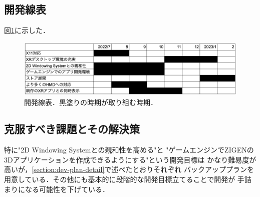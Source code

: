\subsection{開発線表}

図\ref{fig:schedule}に示した．

\begin{figure}[htbp]
  \centering
  \includegraphics[keepaspectratio, width=\linewidth]{fig/schedule.png}
  \caption{開発線表．黒塗りの時期が取り組む時期．}
  \label{fig:schedule}
\end{figure}

\subsection{克服すべき課題とその解決策}

特に"2D Windowing Systemとの親和性を高める"と
"ゲームエンジンでZIGENの3Dアプリケーションを作成できるようにする"という開発目標は
かなり難易度が高いが，\ref{section:dev-plan-detail}で述べたとおりそれぞれ
バックアッププランを用意している．その他にも基本的に段階的な開発目標立てることで開発が
手詰まりになる可能性を下げている．

